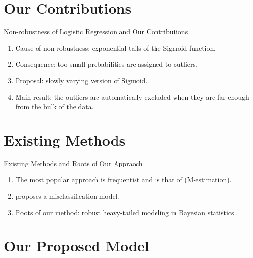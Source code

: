\documentclass{beamer}
\begin{document}
\section{Our Contributions}

\begin{frame}
    \tableofcontents[currentsection]
\end{frame}

\begin{frame}{Non-robustness of Logistic Regression and Our Contributions}

    \begin{enumerate}
    \item Cause of non-robustness: exponential tails of the Sigmoid function.
    \item Consequence: too small probabilities are assigned to outliers.
    \item Proposal: slowly varying version of Sigmoid.
    \item Main result: the outliers are automatically excluded when they are far enough from the bulk of the data.
    \end{enumerate}
    
\end{frame}

\section{Existing Methods}

\begin{frame}
    \tableofcontents[currentsection]
\end{frame}

\begin{frame}{Existing Methods and Roots of Our Appraoch}
    \begin{enumerate}
        \item The most popular approach is frequentist and is that of 
        \cite{Cantoni_Ronchetti_2001} (M-estimation).
        \item  \cite{Russo_Greco_2022} proposes a misclassification 
        model. 
        \item Roots of our method: robust heavy-tailed modeling in Bayesian statistics 
\citep{Desgagne_2015, Gagnon_et_al_2020}.
    \end{enumerate}

\end{frame}

\section{Our Proposed Model}
\end{document}
